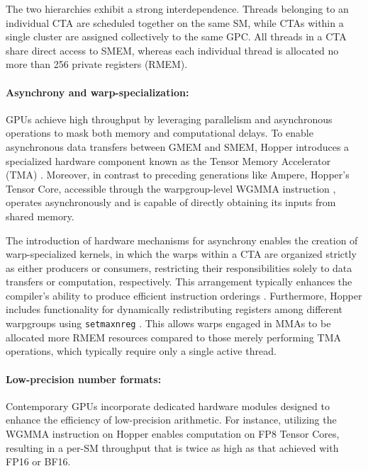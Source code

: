 \begin{enumerate}
The two hierarchies exhibit a strong interdependence. Threads belonging to an individual CTA are scheduled together on the same SM, while CTAs within a single cluster are assigned collectively to the same GPC. All threads in a CTA share direct access to SMEM, whereas each individual thread is allocated no more than 256 private registers (RMEM).

\paragraph{Asynchrony and warp-specialization:}

GPUs achieve high throughput by leveraging parallelism and asynchronous operations to mask both memory and computational delays. To enable asynchronous data transfers between GMEM and SMEM, Hopper introduces a specialized hardware component known as the Tensor Memory Accelerator (TMA) \cite[\S7.29]{cuda}. Moreover, in contrast to preceding generations like Ampere, Hopper's Tensor Core, accessible through the warpgroup-level WGMMA instruction \cite[\S9.7.14]{ptx}, operates asynchronously and is capable of directly obtaining its inputs from shared memory.

The introduction of hardware mechanisms for asynchrony enables the creation of warp-specialized kernels, in which the warps within a CTA are organized strictly as either producers or consumers, restricting their responsibilities solely to data transfers or computation, respectively. This arrangement typically enhances the compiler’s ability to produce efficient instruction orderings \citep{warp-specialization-2011}. Furthermore, Hopper includes functionality for dynamically redistributing registers among different warpgroups using \verb|setmaxnreg| \cite[\S9.7.17.1]{ptx}. This allows warps engaged in MMAs to be allocated more RMEM resources compared to those merely performing TMA operations, which typically require only a single active thread.

\paragraph{Low-precision number formats:}
\label{sec:low-precision-gpu}
Contemporary GPUs incorporate dedicated hardware modules designed to enhance the efficiency of low-precision arithmetic. For instance, utilizing the WGMMA instruction on Hopper enables computation on FP8 Tensor Cores, resulting in a per-SM throughput that is twice as high as that achieved with FP16 or BF16.


\end{enumerate}
